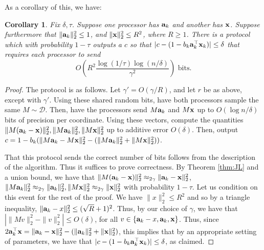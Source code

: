 \documentclass{article}
\def\a{{\bf a}}
\def\x{{\bf x}}
\newtheorem{corollary}{Corollary}
\begin{document}
As a corollary of this, we have:
\begin{corollary}
\label{cor:l2-refetch}
Fix $\delta, \tau$. Suppose one processor has $\a_k$ and another has $\x$.
Suppose furthermore that $\| \a_k \|_2^2 \leq 1$, and $\| \x \|_2^2 \leq R^2$, where $R \geq 1$.
 There is a protocol which with probability $1 - \tau$ outputs a $c$ so that $|c - (1 - b_k \a_k^\top \x_k)| \leq \delta$ that requires each processor to send 
 \[
 O\left( R^2 \frac{\log (1 / \tau) \log (n / \delta)}{\gamma^2} \right) \text{  bits.}
 \]
\end{corollary}
\begin{proof}
The protocol is as follows.
Let $\gamma' = O(\gamma / R)$, and let $r$ be as above, except with $\gamma'$.
Using these shared random bits, have both processors sample the same $M \sim \mathcal{D}$.
Then, have the processors send $M \a_k$ and $M \x$ up to $O(\log n / \delta)$ bits of precision per coordinate.
Using these vectors, compute the quantities $\| M (\a_k - \x) \|_2^2, \| M \a_k \|_2^2, \| M \x \|_2^2$ up to additive error $O(\delta)$.
Then, output 
$c = 1 - b_k (\| M \a_k - M \x \|_2^2 - ( \| M \a_k \|_2^2 + \| M \x \|_2^2 ))$.

That this protocol sends the correct number of bits follows from the description of the algorithm.
Thus it suffices to prove correctness.
By Theorem \ref{thm:JL} and a union bound, we have that $\| M (\a_k - \x) \|_2^2 \approx_{2 \gamma} \| \a_k - \x \|_2^2$, $ \| M \a_k \|_2^2 \approx_{2 \gamma} \| \a_k \|_2^2, \| M \x \|_2^2 \approx_{2 \gamma} \| \x \|_2^2$ with probability $1-\tau$.
Let us condition on this event for the rest of the proof.
We have $\| x \|_2^2 \leq R^2$ and so by a triangle inequality, $\| \a_k - x \|_2^2 \leq (\sqrt{R} + 1)^2$.
Thus, by our choice of $\gamma$, we have that $|\| M v \|_2^2 - \| v \|_2^2 | \leq O(\delta)$, for all $v \in \{\a_k - x, \a_k, \x \}$.
Thus, since $2 \a_k^\top \x = \| \a_k - \x \|_2^2 - ( \| \a_k \|_2^2 + \| \x \|_2^2 )$, this implies that by an appropriate setting of parameters, we have that $|c - (1 - b_k \a_k^\top \x_k)| \leq \delta$, as claimed.
\end{proof}
\end{document}
